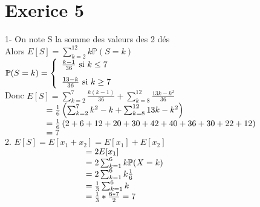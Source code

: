 \documentclass{article}
\author{Frederic Becerril}
\newcommand\tab[1][1cm]{\hspace*{#1}}
\begin{document}
\part*{Exerice 5}

1- On note S la somme des valeurs des 2 dés\\
Alors $E[S] = \sum_{k = 2}^{12} k \mathbb{P}(S = k)$\\
$\mathbb{P}(S = k) = \left\{
    \begin{array}{ll}
       \frac{k - 1}{36} \mbox{ si } k \leq 7 \vspace{3mm} \\
       \frac{13 - k}{36} \mbox{ si } k \geq 7\\
    \end{array}
\right.$\\
Donc $E[S] = \sum_{k = 2}^{7} \frac{k(k - 1)}{36} + \sum_{k = 8}^{12} \frac{13k - k^2}{36}$\\
$\tab[1.7cm] = \frac{1}{6} \left(\sum_{k = 2}^{7} k^2 - k + \sum_{k = 8}^{12} 13k - k^2\right)$\\
$\tab[1.7cm] = \frac{1}{6} \left(2 + 6 + 12 + 20 + 30 + 42 + 40 + 36 + 30 + 22 + 12\right)$\\
$\tab[1.7cm] = 7$
\\
2. $E[S] = E[x_1 + x_2] = E[x_1] + E[x_2]$\\
$\tab[3.35cm] = 2 E[x_1]$\\
$\tab[3.35cm] = 2 \sum_{k = 1}^6 k \mathbb{P}(X = k)$\\
$\tab[3.35cm] = 2 \sum_{k = 1}^6 k \frac{1}{6}$\\
$\tab[3.35cm] = \frac{1}{3} \sum_{k = 1}^6 k$\\
$\tab[3.35cm] = \frac{1}{3} * \frac{6 * 7}{2} = 7$\\
\end{document}
